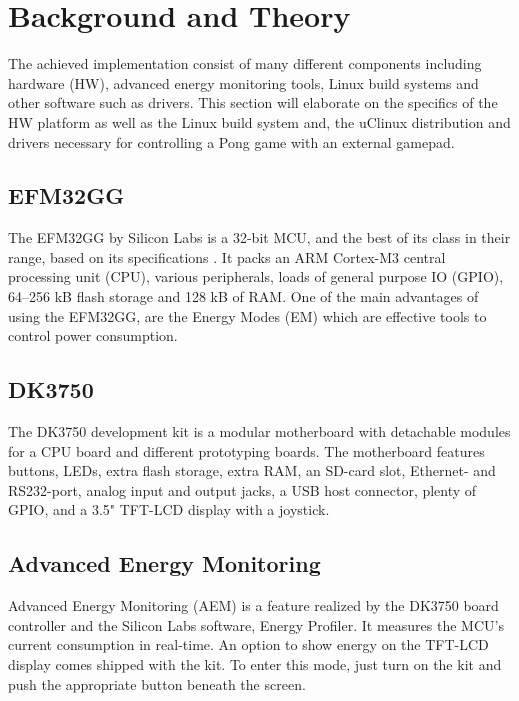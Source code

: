 \chapter{Background and Theory}

The achieved implementation consist of many different components including hardware (HW), advanced energy monitoring tools, Linux build systems and other software such as drivers. This section will elaborate on the specifics of the HW platform as well as the Linux build system and, the uClinux distribution and drivers necessary for controlling a Pong game with an external gamepad.

\section{EFM32GG}
The EFM32GG by Silicon Labs is a 32-bit MCU, and the best of its class in their range, based on its specifications \cite{SLABSMCUS}. It packs an ARM Cortex-M3 central processing unit (CPU), various peripherals, loads of general purpose IO (GPIO), 64–256 kB flash storage and 128 kB of RAM. One of the main advantages of using the EFM32GG, are the Energy Modes (EM) which are effective tools to control power consumption. \\

\section{DK3750}
The DK3750 development kit is a modular motherboard with detachable modules for a CPU board and different prototyping boards. The motherboard features buttons, LEDs, extra flash storage, extra RAM, an SD-card slot, Ethernet- and RS232-port, analog input and output jacks, a USB host connector, plenty of GPIO, and a 3.5" TFT-LCD display with a joystick.\cite{DK3750RM}

\section{Advanced Energy Monitoring}
Advanced Energy Monitoring (AEM) is a feature realized by the DK3750 board controller and the Silicon Labs software, Energy Profiler. It measures the MCU's current consumption in real-time. An option to show energy on the TFT-LCD display comes shipped with the kit. To enter this mode, just turn on the kit and push the appropriate button beneath the screen. 

